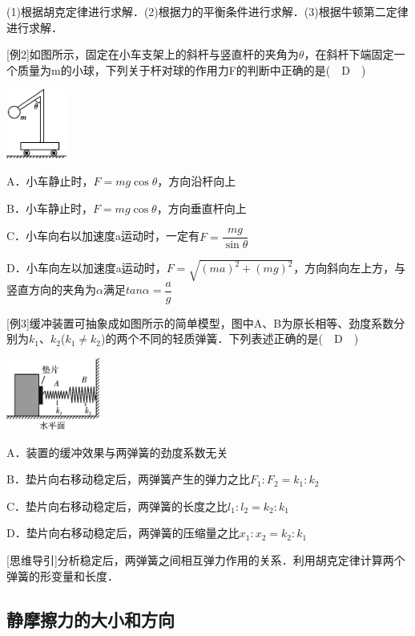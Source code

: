 \documentclass[cn,10.5pt,chinese,mac,chinesefont=founder]{elegantbook}
\begin{document}
(1)根据胡克定律进行求解．(2)根据力的平衡条件进行求解．(3)根据牛顿第二定律进行求解．

{[}例2{]}如图所示，固定在小车支架上的斜杆与竖直杆的夹角为$\theta$，在斜杆下端固定一个质量为m的小球，下列关于杆对球的作用力F的判断中正确的是(　D　)\begin{center}\includegraphics[width=0.78125in,height=0.89583in]{media/image46.png}\end{center}

A．小车静止时，$F=mg\cos \theta$，方向沿杆向上

B．小车静止时，$F=mg\cos \theta$，方向垂直杆向上

C．小车向右以加速度a运动时，一定有$F=\dfrac{mg}{\sin\theta}$

D．小车向左以加速度a运动时，$F=\sqrt{(ma)^2+(mg)^2}$，方向斜向左上方，与竖直方向的夹角为$\alpha$满足$tan\alpha=\dfrac{a}{g}$

{[}例3{]}缓冲装置可抽象成如图所示的简单模型，图中A、B为原长相等、劲度系数分别为$k_1$、$k_2$($k_1\neq k_2$)的两个不同的轻质弹簧．下列表述正确的是(　D　)

\begin{center}\includegraphics[width=1.20833in,height=0.92708in]{media/image47.png}\end{center}

A．装置的缓冲效果与两弹簧的劲度系数无关

B．垫片向右移动稳定后，两弹簧产生的弹力之比$F_1:F_2=k_1:k_2　$

C．垫片向右移动稳定后，两弹簧的长度之比$l_1:l_2=k_2:k_1$

D．垫片向右移动稳定后，两弹簧的压缩量之比$x_1:x_2=k_2:k_1$　

{[}思维导引{]}分析稳定后，两弹簧之间相互弹力作用的关系．利用胡克定律计算两个弹簧的形变量和长度．

\subsection{静摩擦力的大小和方向}
\end{document}
